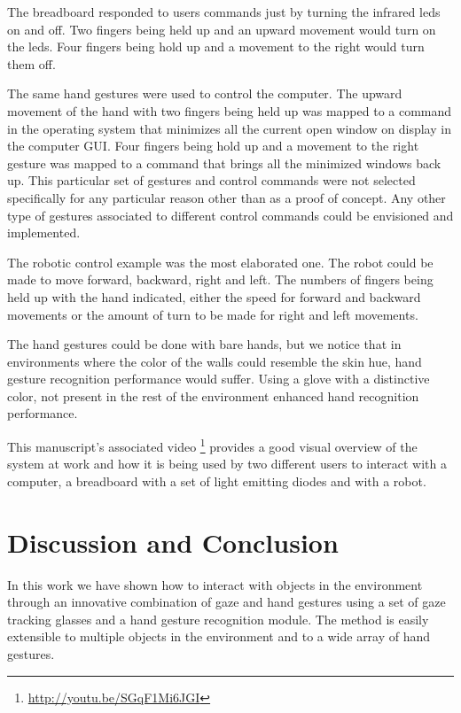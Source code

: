 \documentclass[jou,a4paper,notxfonts]{apa}
\begin{document}
The breadboard responded to users commands just by turning the infrared leds on and off. Two fingers being held up and
an upward movement would turn on the leds. Four fingers being hold up and a movement to the right would turn them off.

The same hand gestures were used to control the computer. The upward movement of the hand with two fingers being held up
was mapped to a command in the operating system that minimizes all the current open window on display in the computer
GUI. Four fingers being hold up and a movement to the right gesture was mapped to a command that brings all the
minimized windows back up. This particular set of gestures and control commands were not selected specifically for
any particular reason other than as a proof of concept. Any other type of gestures associated to different
control commands could be envisioned and implemented.

The robotic control example was the most elaborated one. The robot could be made to move forward, backward, right and
left. The numbers of fingers being held up with the hand indicated, either the speed for forward and backward movements
or the amount of turn to be made for right and left movements.

The hand gestures could be done with bare hands, but we notice that in environments where the color of the walls could
resemble the skin hue, hand gesture recognition performance would suffer. Using a glove with a distinctive color, not 
present in the rest of the environment enhanced hand recognition performance.

This manuscript's associated video \footnote{\url{http://youtu.be/SGqF1Mi6JGI}} provides a good visual
overview of the system at work and how it is being used by two different users to interact with a computer, a breadboard
with a set of light emitting diodes and with a robot.


\section{Discussion and Conclusion}
In this work we have shown how to interact with objects in the environment through an innovative combination of gaze and
hand gestures using a set of gaze tracking glasses and a hand gesture recognition module. The method is easily
extensible to multiple objects in the environment and to a wide array of hand gestures.
\end{document}
